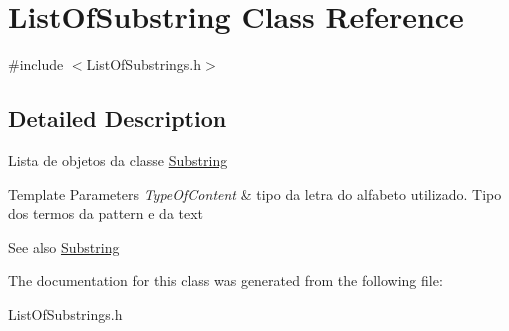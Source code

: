 \hypertarget{classListOfSubstring}{\section{List\+Of\+Substring Class Reference}
\label{classListOfSubstring}
}


{\ttfamily \#include $<$List\+Of\+Substrings.\+h$>$}



\subsection{Detailed Description}
Lista de objetos da classe \hyperlink{classSubstring}{Substring} 
\begin{DoxyTemplParams}{Template Parameters}
{\em Type\+Of\+Content} & tipo da letra do alfabeto utilizado. Tipo dos termos da pattern e da text \\
\hline
\end{DoxyTemplParams}
\begin{DoxySeeAlso}{See also}
\hyperlink{classSubstring}{Substring} 
\end{DoxySeeAlso}


The documentation for this class was generated from the following file\+:\begin{DoxyCompactItemize}
\item 
List\+Of\+Substrings.\+h\end{DoxyCompactItemize}
